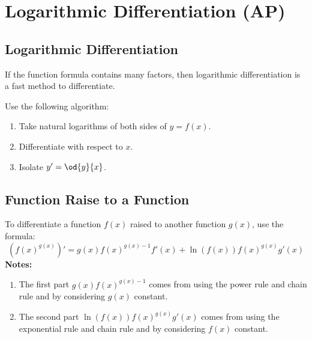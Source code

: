 \section{Logarithmic Differentiation (AP)}
\subsection{Logarithmic Differentiation}
	If the function formula contains many factors, then logarithmic differentiation is a fast method to differentiate.

	Use the following algorithm:
	\begin{enumerate}
		\item Take natural logarithms of both sides of $y=f(x)$.
		\item Differentiate with respect to $x$.
		\item Isolate $y' = \od{y}{x}$.
	\end{enumerate}
\subsection{Function Raise to a Function}
	To differentiate a function $f(x)$ raised to another function $g(x)$, use the formula:
	\[\left( f(x)^{g(x)} \right)' = g(x)f(x)^{g(x)-1} f'(x) + \ln(f(x))f(x)^{g(x)}g'(x)\]
	\textbf{Notes:}
	\begin{enumerate}
		\item The first part $g(x)f(x)^{g(x)-1}$ comes from using the power rule and chain rule and by considering $g(x)$ constant.
		\item The second part $\ln(f(x))f(x)^{g(x)}g'(x)$ comes from using the exponential rule and chain rule and by considering $f(x)$ constant.
	\end{enumerate}
